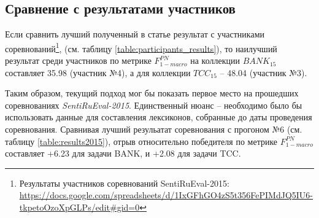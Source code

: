 \subsection{Сравнение с результатами участников}

Если сравнить лучший полученный в статье результат с участниками соревнований\footnote{
    Результаты участников соревнований SentiRuEval-2015:
    \url{https://docs.google.com/spreadsheets/d/1IxGFhGO4zS5t356FePIMdJQ5IU6-tkpetoOzoXpGLPs/edit\#gid=0}
},
(см. таблицу \ref{table:participants_results}),
то наилучший результат среди участников по метрике $F_{1-macro}^{PN}$ на коллекции $BANK_{15}$
составляет 35.98 (участник №4), а для коллекции $TCC_{15}$ -- 48.04 (участник №3).

Таким образом, текущий подход мог бы показать первое место на прошедших
соревнованиях {\it SentiRuEval-2015}.
Единственный нюанс -- необходимо было бы использовать данные для составления
лексиконов, собранные до даты проведения соревнования.
Сравнивая лучший резульатат соревнования с прогоном №6
(см. таблицу \ref{table:results2015}), отрыв относительно победителя
по метрике $F_{1-macro}^{PN}$ составляет +6.23 для задачи BANK,
и +2.08 для задачи TCC.

